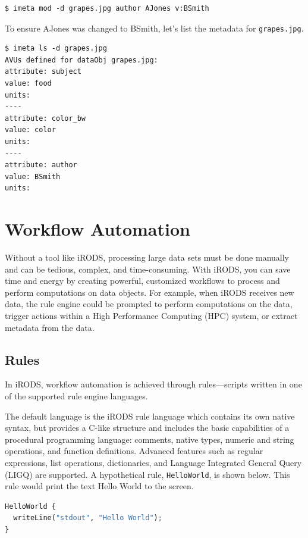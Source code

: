 \documentclass[10pt,oneside]{memoir}
\begin{document}
\begin{lstlisting}
$ imeta mod -d grapes.jpg author AJones v:BSmith
\end{lstlisting}

To ensure AJones was changed to BSmith, let's list the metadata for \texttt{grapes.jpg}.

\begin{lstlisting}
$ imeta ls -d grapes.jpg
AVUs defined for dataObj grapes.jpg:
attribute: subject
value: food
units:
----
attribute: color_bw
value: color
units:
----
attribute: author
value: BSmith
units:
\end{lstlisting}

\chapter{Workflow Automation}

Without a tool like iRODS, processing large data sets must be done manually and can be tedious, complex, and time-consuming. With iRODS, you can save time and energy by creating powerful, customized workflows to process and perform computations on data objects. For example, when iRODS receives new data, the rule engine could be prompted to perform computations on the data, trigger actions within a High Performance Computing (HPC) system, or extract metadata from the data.

\section{Rules}

In iRODS, workflow automation is achieved through rules---scripts written in one of the supported rule engine languages.

The default language is the iRODS rule language which contains its own native syntax, but provides a C-like structure and includes the basic capabilities of a procedural programming language: comments, native types, numeric and string operations, and function definitions. Advanced features such as regular expressions, list operations, dictionaries, and Language Integrated General Query (LIGQ) are supported. A hypothetical rule, \texttt{HelloWorld}, is shown below. This rule would print the text Hello World to the screen.

\begin{lstlisting}[language=python]
HelloWorld {
  writeLine("stdout", "Hello World");
}
\end{lstlisting}
\end{document}
